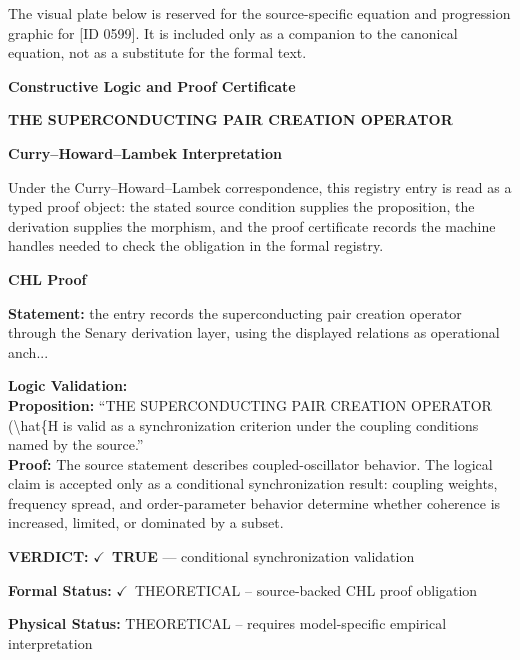 \begingroup\footnotesize\sloppy
The visual plate below is reserved for the source-specific equation and progression graphic for [ID 0599]. It is included only as a companion to the canonical equation, not as a substitute for the formal text.
\par\endgroup
\ifTZPDarkEdition
{}
\fi

\clearpage
\begingroup\tzpsupportsetup
\noindent\textbf{\fontsize{10.8pt}{12.8pt}\selectfont [ID 0599] Constructive Logic and Proof Certificate}\par
\noindent\textbf{\fontsize{10pt}{12pt}\selectfont THE SUPERCONDUCTING PAIR CREATION OPERATOR}\par
\vspace{0.45em}
\begingroup
\footnotesize
\setlength{\parskip}{0.22em}
\setlength{\parindent}{0pt}
\noindent\textbf{Curry--Howard--Lambek Interpretation}\par
Under the Curry--Howard--Lambek correspondence, this registry entry is read as a typed proof
object: the stated source condition supplies the proposition, the derivation supplies the
morphism, and the proof certificate records the machine handles needed to check the obligation
in the formal registry.

\vspace{0.45em}
\noindent\textbf{CHL Proof}\par
\textbf{Statement:} the entry records the superconducting pair creation operator through the Senary
derivation layer, using the displayed relations as operational anch...

\textbf{Logic Validation:}\\
\textbf{Proposition:} ``THE SUPERCONDUCTING PAIR CREATION OPERATOR (\textbackslash{}hat\{H is valid as a synchronization
criterion under the coupling conditions named by the source.''\\
\textbf{Proof:} The source statement describes coupled-oscillator behavior. The logical claim is
accepted only as a conditional synchronization result: coupling weights, frequency
spread, and order-parameter behavior determine whether coherence is increased, limited,
or dominated by a subset.

\textbf{VERDICT:} \ensuremath{\checkmark}\ \textbf{TRUE} --- conditional synchronization validation

\textbf{Formal Status:} \ensuremath{\checkmark}\ THEORETICAL -- source-backed CHL proof obligation

\textbf{Physical Status:} THEORETICAL -- requires model-specific empirical interpretation
\par\vspace{0.45em}
\par
\ifTZPDarkEdition
{}
\fi
\endgroup
\endgroup
